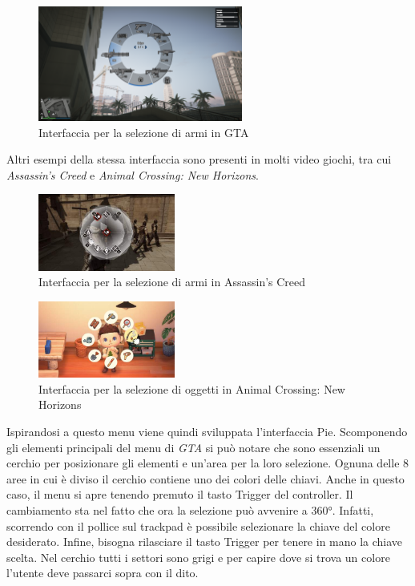 \documentclass[target=bach,aauheader=]{thud}
\begin{document}
\begin{figure}[h]
    \centering
    \includegraphics[width=0.60\textwidth]{gta}
    \caption{Interfaccia per la selezione di armi in GTA}
    \label{fig:gta}
\end{figure}

Altri esempi della stessa interfaccia sono presenti in molti video giochi, tra cui \textit{Assassin's Creed} e \textit{Animal Crossing: New Horizons}.

\begin{figure}[h]
    \centering
    \includegraphics[width=0.40\textwidth]{ac}
    \caption{Interfaccia per la selezione di armi in Assassin's Creed}
    \label{fig:ac}
\end{figure}

\begin{figure}[h]
    \centering
    \includegraphics[width=0.40\textwidth]{nh}
    \caption{Interfaccia per la selezione di oggetti in Animal Crossing: New Horizons}
    \label{fig:nh}
\end{figure}

Ispirandosi a questo menu viene quindi sviluppata l'interfaccia Pie.
Scomponendo gli elementi principali del menu di \textit{GTA} si può notare che sono essenziali un cerchio per posizionare gli elementi e un'area per la loro selezione.
Ognuna delle 8 aree in cui è diviso il cerchio contiene uno dei colori delle chiavi.
Anche in questo caso, il menu si apre tenendo premuto il tasto Trigger del controller.
Il cambiamento sta nel fatto che ora la selezione può avvenire a 360°.
Infatti, scorrendo con il pollice sul trackpad è possibile selezionare la chiave del colore desiderato.
Infine, bisogna rilasciare il tasto Trigger per tenere in mano la chiave scelta.
Nel cerchio tutti i settori sono grigi e per capire dove si trova un colore l'utente deve passarci sopra con il dito.
\end{document}
